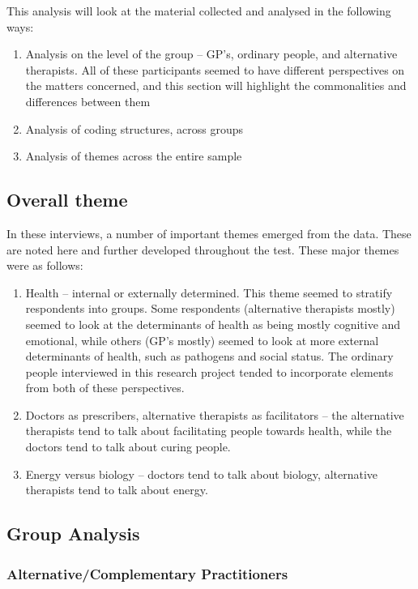 This analysis will look at the material collected and analysed in the following ways:

\begin{enumerate}
\item Analysis on the level of the group – GP's, ordinary people, and alternative therapists. All of these participants seemed to have different perspectives on the matters concerned, and this section will highlight the commonalities and differences between them
\item  Analysis of coding structures, across groups
\item Analysis of themes across the entire sample 
\end{enumerate}

\subsection{Overall theme}

In these interviews, a number of important themes emerged from the data. These are noted here and further developed throughout the test. These major themes were as follows:
\begin{enumerate}
\item Health – internal or externally determined. This theme seemed to stratify respondents into groups. Some respondents (alternative therapists mostly) seemed to look at the determinants of health as being mostly cognitive and emotional, while others (GP's mostly) seemed to look at more external determinants of health, such as pathogens and social status. The ordinary people interviewed in this research project tended to incorporate elements from both of these perspectives.
\item Doctors as prescribers, alternative therapists as facilitators – the alternative therapists tend to talk about facilitating people towards health, while the doctors tend to talk about curing people. 
\item Energy versus biology – doctors tend to talk about biology, alternative therapists tend to talk about energy. 

\end{enumerate}



\subsection{Group Analysis}

\subsubsection{Alternative/Complementary Practitioners}


